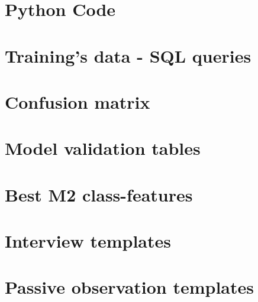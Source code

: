 \appendix
\chapter{Python Code} \label{python_code}

\chapter{Training's data - SQL queries} \label{sql_queries_for_trainingdata}

\chapter{Confusion matrix} \label{confusion_matrix}

\chapter{Model validation tables} \label{model_validation_tables}

\chapter{Best M2 class-features} \label{M2_top_features}

\chapter{Interview templates} \label{interview_templates}

\chapter{Passive observation templates} \label{passive_obs_templates}

